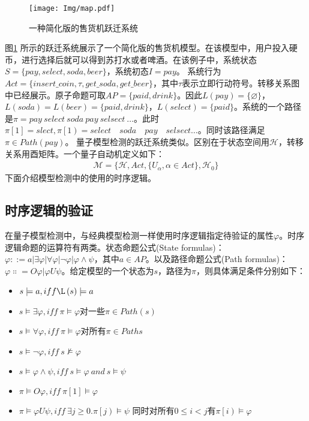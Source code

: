 \begin{figure}[!htbp]
    \centering
    \texttt{[image: Img/map.pdf]}
    \caption{一种简化版的售货机跃迁系统}
    \label{fig:transition-system}
\end{figure}

图\ref{fig:transition-system} 所示的跃迁系统展示了一个简化版的售货机模型。在该模型中，用户投入硬币，进行选择后就可以得到苏打水或者啤酒。在该例子中，系统状态\(S=\{pay,select,soda,beer\}\)，系统初态\(I=pay\)。
系统行为\(Act=\{insert\_coin,\tau,get\_soda,get\_beer\}\)，其中\(\tau\)表示立即行动符号。转移关系图中已经展示。原子命题可取\(AP=\{paid,drink\}\)。因此\(L\left( pay \right)=\{\varnothing\}\)，\(L\left(soda\right)=L\left(beer\right)=\{paid,drink\}\)，\(L\left(select\right)=\{paid\}\)。系统的一个路径是\(\pi=pay\ select\ soda\ pay\ selsect\ \ldots\)。此时\(\pi\left[1\right]=slect,\pi\left[1\right)=select\quad soda\quad pay\quad selsect\ldots\)。同时该路径满足\(\pi\in Path\left(pay\right)\)。
量子模型检测的跃迁系统类似。区别在于状态空间用\(\mathcal{H}\)，转移关系用酉矩阵。一个量子自动机定义如下：
\begin{align}
    \mathcal{M}=\{\mathcal{H},Act,\{U_\alpha,\alpha\in Act\},\mathcal{H}_0\}
\end{align}
下面介绍模型检测中的使用的时序逻辑。

\subsection{时序逻辑的验证}
在量子模型检测中，与经典模型检测一样使用时序逻辑指定待验证的属性\(\varphi\)。时序逻辑命题的运算符有两类\citep{goranko_2023}。状态命题公式(State formulas)：\(\varphi ::=a\left|\exists\varphi\right|\forall \varphi\left|\lnot\varphi\right|\varphi\land\psi\)，其中\(a\in AP\)。以及路径命题公式(Path formulas)：\(\varphi\Colon=O\varphi|\varphi U\psi\)。给定模型的一个状态为\(s\)，路径为\(\pi\)，则具体满足条件分别如下：
\begin{itemize}
    \item \(s\models a,iff \L\left(s\right)\models a\)
    \item \(s\models\exists\varphi,iff\ \pi\models\varphi\)对一些\(\pi\in Path\left(s\right)\)
    \item \(s\models\forall\varphi,iff\ \pi\models\varphi\)对所有\(π\in Paths\)
    \item \(s\models\lnot\varphi,iff\ s\nvDash\varphi\)
    \item \(s\models\varphi\land\psi,iff\ s\models\varphi\ and\ s\models\psi\)
    \item \(\pi\models O\varphi,iff\ \pi\left[1\right]\models\varphi\)
    \item \(\pi\models\varphi U\psi,iff\ \exists j\geq0\).\(\pi\left[j\right)\models\psi\) 同时对所有\(0\le i<j\)有\(\pi\left[i\right)\models\varphi\)
\end{itemize}


